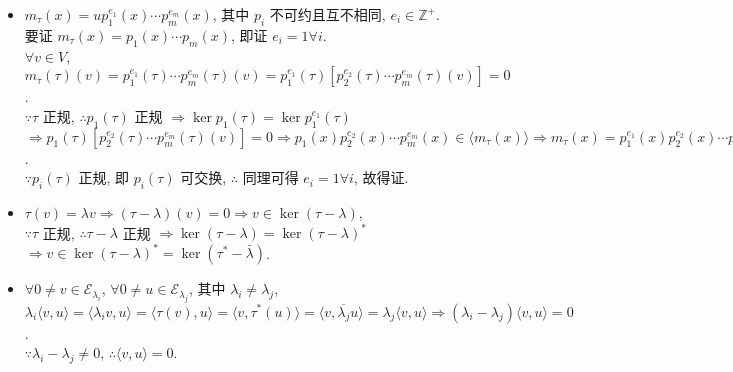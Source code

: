 \documentclass{note}
\begin{document}
\begin{pf}
\begin{itemize}
        $\Longrightarrow 0=\langle v,0\rangle=\langle v,\sigma(v)\rangle=\langle v,\tau^*(\tau(v))\rangle=\langle\tau(v),\tau(v)\rangle=\norm{\tau(v)}^2\Longrightarrow\tau(v)=0\Longrightarrow v\in\ker\tau\Longrightarrow\ker\tau^k\subseteq\ker\tau$.\\
        综上, 得证.
        \item[(4)] $m_{\tau}(x)=up_1^{e_1}(x)\cdots p_m^{e_m}(x)$, 其中 $p_i$ 不可约且互不相同, $e_i\in\mathbb{Z}^+$.\\
        要证 $m_{\tau}(x)=p_1(x)\cdots p_m(x)$, 即证 $e_i=1\forall i$.\\
        $\forall v\in V$, $m_{\tau}(\tau)(v)=p_1^{e_1}(\tau)\cdots p_m^{e_m}(\tau)(v)=p_1^{e_1}(\tau)[p_2^{e_2}(\tau)\cdots p_m^{e_m}(\tau)(v)]=0$.\\
        $\because\tau$ 正规, $\therefore p_1(\tau)$ 正规 $\Longrightarrow\ker p_1(\tau)=\ker p_1^{e_1}(\tau)$\\
        $\Longrightarrow p_1(\tau)[p_2^{e_2}(\tau)\cdots p_m^{e_m}(\tau)(v)]=0\Longrightarrow p_1(x)p_2^{e_2}(x)\cdots p_m^{e_m}(x)\in\langle m_{\tau}(x)\rangle\Longrightarrow m_{\tau}(x)=p_1^{e_1}(x)p_2^{e_2}(x)\cdots p_m^{e_m}(x)\mid p_1^1(x)p_2^{e_2}(x)\cdots p_m^{e_m}(x)\Longrightarrow e_1=1$.\\
        $\because p_i(\tau)$ 正规, 即 $p_i(\tau)$ 可交换, $\therefore$ 同理可得 $e_i=1\forall i$, 故得证.
        \item[(5)] $\tau(v)=\lambda v\Longrightarrow(\tau-\lambda)(v)=0\Longrightarrow v\in\ker(\tau-\lambda)$,\\
        $\because\tau$ 正规, $\therefore\tau-\lambda$ 正规 $\Longrightarrow\ker(\tau-\lambda)=\ker(\tau-\lambda)^*$\\
        $\Longrightarrow v\in\ker(\tau-\lambda)^*=\ker(\tau^*-\bar{\lambda})$.
        \item[(6)] $\forall 0\neq v\in\mathcal{E}_{\lambda_i}$, $\forall 0\neq u\in\mathcal{E}_{\lambda_j}$, 其中 $\lambda_i\neq\lambda_j$, $\lambda_i\langle v,u\rangle=\langle\lambda_iv,u\rangle=\langle\tau(v),u\rangle=\langle v,\tau^*(u)\rangle=\langle v,\overline{\lambda_j}u\rangle=\lambda_j\langle v,u\rangle\Longrightarrow(\lambda_i-\lambda_j)\langle v,u\rangle=0$.\\
        $\because\lambda_i-\lambda_j\neq 0$, $\therefore\langle v,u\rangle=0$.
    \end{itemize}
\end{pf}
\end{document}
